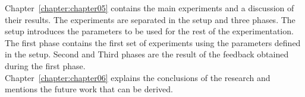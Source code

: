 Chapter~\ref{chapter:chapter05} contains the main experiments and a discussion of their results. The experiments are separated in the setup and three phases. The setup introduces the parameters to be used for the rest of the experimentation. The first phase contains the first set of experiments using the parameters defined in the setup. Second and Third phases are the result of the feedback obtained during the first phase. \\

Chapter~\ref{chapter:chapter06} explains the conclusions of the research and mentions the future work that can be derived.